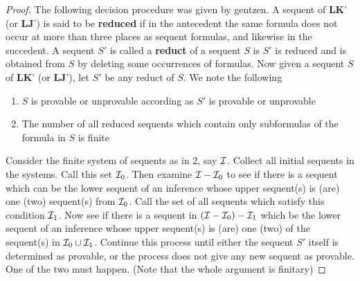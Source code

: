 \documentclass[11pt]{article}
\def \LKp {\textbf{LK'}}
\def \LJp {\textbf{LJ'}}
\begin{document}
\begin{proof}
The following decision procedure was given by gentzen. A sequent of \(\LKp\)  (or \(\LJp\)) is
said to be \textbf{reduced} if in the antecedent the same formula does not occur at more than three places
as sequent formulas, and likewise in the succedent. A sequent \(S'\) is called a \textbf{reduct} of a
sequent \(S\) is \(S'\) is reduced and is obtained from \(S\) by deleting some occurrences of
formulas. Now given a sequent \(S\) of \(\LKp\) (or \(\LJp\)), let \(S'\) be any reduct of \(S\).
We note the following
\begin{enumerate}
\item \(S\) is provable or unprovable according as \(S'\) is provable or unprovable
\item The number of all reduced sequents which contain only subformulas of the formula in \(S\) is
finite
\end{enumerate}


Consider the finite system of sequents as in 2, say \(\mathcal{I}\).  Collect all initial sequents in
the systems. Call this set \(\mathcal{I}_0\). Then examine \(\mathcal{I}-\mathcal{I}_0\) to see if there is a
sequent which can be the lower sequent of an inference whose upper sequent(s) is (are) one (two)
sequent(s) from \(\mathcal{I}_0\). Call the set of all sequents which satisfy this
condition \(\mathcal{I}_1\). Now see if there is a sequent in \((\mathcal{I}-\mathcal{I}_0)-\mathcal{I}_1\) which be the
lower sequent of an inference whose upper sequent(s) is (are) one (two) of the sequent(s)
in \(\mathcal{I}_0\cup\mathcal{I}_1\). Continue this process until either the sequent \(S'\) itself is
determined as provable, or the process does not give any new sequent as provable. One of the two
must happen. (Note that the whole argument is finitary)
\end{proof}
\end{document}

